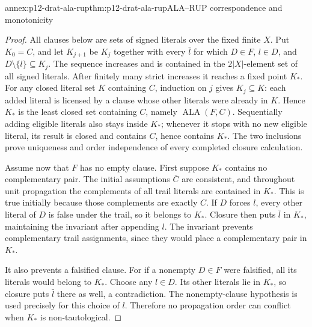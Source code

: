 \begin{annexitem}{annex:p12-drat-ala-rup}{thm:p12-drat-ala-rup}{ALA--RUP correspondence and monotonicity}
\begin{proof}
All clauses below are sets of signed literals over the fixed finite \(X\).
Put \(K_0=C\), and let \(K_{j+1}\) be \(K_j\) together with every
\(\bar l\) for which \(D\in F\), \(l\in D\), and
\(D\setminus\{l\}\subseteq K_j\).  The sequence increases and is
contained in the \(2\lvert X\rvert\)-element set of all signed literals.
After finitely many strict increases it reaches a fixed point \(K_*\).
For any closed literal set \(K\) containing \(C\), induction on \(j\)
gives \(K_j\subseteq K\): each added literal is licensed by a clause
whose other literals were already in \(K\).  Hence \(K_*\) is the least
closed set containing \(C\), namely \(\operatorname{ALA}(F,C)\).
Sequentially adding eligible literals also stays inside \(K_*\); whenever
it stops with no new eligible literal, its result is closed and contains
\(C\), hence contains \(K_*\).  The two inclusions prove uniqueness and
order independence of every completed closure calculation.

Assume now that \(F\) has no empty clause.  First suppose \(K_*\) contains
no complementary pair.  The initial assumptions \(\bar C\) are consistent,
and throughout unit propagation the complements of all trail literals are
contained in \(K_*\).  This is true initially because those complements
are exactly \(C\).  If \(D\) forces \(l\), every other literal of
\(D\) is false under the trail, so it belongs to \(K_*\).  Closure then
puts \(\bar l\) in \(K_*\), maintaining the invariant after appending
\(l\).  The invariant prevents complementary trail assignments, since
they would place a complementary pair in \(K_*\).

It also prevents a falsified clause.  For if a nonempty \(D\in F\) were
falsified, all its literals would belong to \(K_*\).  Choose any
\(l\in D\).  Its other literals lie in \(K_*\), so closure puts
\(\bar l\) there as well, a contradiction.  The nonempty-clause hypothesis
is used precisely for this choice of \(l\).  Therefore no propagation
order can conflict when \(K_*\) is non-tautological.


\end{proof}
\end{annexitem}
